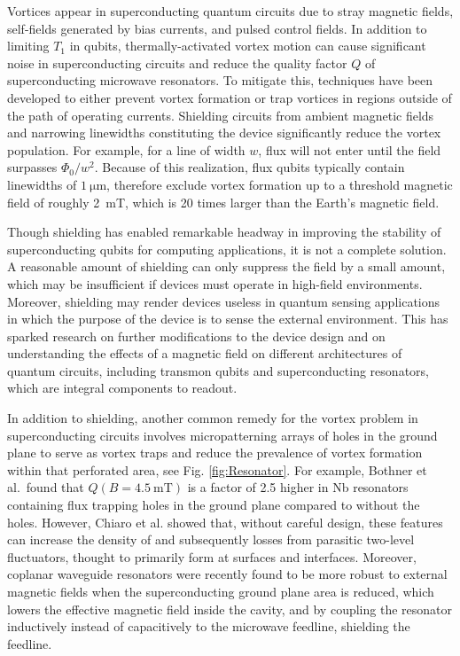\documentclass[%
 aip,
 amsmath,amssymb,
 reprint,%
floatfix]{revtex4-1}
\begin{document}
Vortices appear in superconducting quantum circuits due to stray magnetic fields, self-fields generated by bias currents, and pulsed control fields. In addition to limiting $T_1$ in qubits, thermally-activated vortex motion can cause significant noise in superconducting circuits and reduce the quality factor $Q$ of superconducting microwave resonators\cite{Song2009, Song2009a, Kroll2019}. To mitigate this, techniques have been developed to either prevent vortex formation or trap vortices in regions outside of the path of operating currents. Shielding circuits from ambient magnetic fields and narrowing linewidths constituting the device\cite{DVH2004, Samkharadze2016} significantly reduce the vortex population.  For example, for a line of width $w$, flux will not enter until the field surpasses $\Phi_0/w^2$. Because of this realization, flux qubits typically contain linewidths of $\SI{1}{\micro\meter}$, therefore exclude vortex formation up to a threshold magnetic field of roughly \SI{2}{\milli\tesla}, which is 20 times larger than the Earth's magnetic field\cite{DVH2004}.  

Though shielding has enabled remarkable headway in improving the stability of superconducting qubits for computing applications, it is not a complete solution. A reasonable amount of shielding can only suppress the field by a small amount, which may be insufficient if devices must operate in high-field environments.  Moreover, shielding may render devices useless in quantum sensing applications in which the purpose of the device is to sense the external environment. This has sparked research on further modifications to the device design and on understanding the effects of a magnetic field on different architectures of quantum circuits, including transmon qubits\cite{Schneider2019} and superconducting resonators\cite{Bothner2017, Kroll2019}, which are integral components to readout.


In addition to shielding, another common remedy for the vortex problem in superconducting circuits involves micropatterning arrays of holes in the ground plane to serve as vortex traps and reduce the prevalence of vortex formation within that perforated area\cite{Song2009a, Bothner2011, Bothner2012, Chiaro2016}, see Fig. \ref{fig:Resonator}. For example, Bothner et al.\ found that $Q(B=\SI{4.5}{\milli\tesla})$ is a factor of 2.5 higher in Nb resonators containing flux trapping holes in the ground plane \cite{Bothner2011} compared to without the holes.  However, Chiaro et al.\cite{Chiaro2016} showed that, without careful design, these features can increase the density of and subsequently losses from parasitic two-level fluctuators, thought to primarily form at surfaces and interfaces.  Moreover, coplanar waveguide resonators were recently found to be more robust to external magnetic fields when the superconducting ground plane area is reduced, which lowers the effective magnetic field inside the cavity, and by coupling the resonator inductively instead of capacitively to the microwave feedline, shielding the feedline\cite{Bothner2017}.
\end{document}
